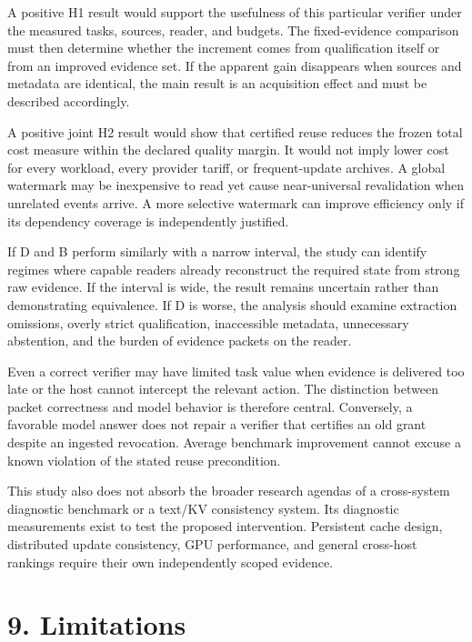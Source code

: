 \documentclass[
  11pt,
  a4paper,
]{article}
\begin{document}
A positive H1 result would support the usefulness of this particular
verifier under the measured tasks, sources, reader, and budgets. The
fixed-evidence comparison must then determine whether the increment
comes from qualification itself or from an improved evidence set. If the
apparent gain disappears when sources and metadata are identical, the
main result is an acquisition effect and must be described accordingly.

A positive joint H2 result would show that certified reuse reduces the
frozen total cost measure within the declared quality margin. It would
not imply lower cost for every workload, every provider tariff, or
frequent-update archives. A global watermark may be inexpensive to read
yet cause near-universal revalidation when unrelated events arrive. A
more selective watermark can improve efficiency only if its dependency
coverage is independently justified.

If D and B perform similarly with a narrow interval, the study can
identify regimes where capable readers already reconstruct the required
state from strong raw evidence. If the interval is wide, the result
remains uncertain rather than demonstrating equivalence. If D is worse,
the analysis should examine extraction omissions, overly strict
qualification, inaccessible metadata, unnecessary abstention, and the
burden of evidence packets on the reader.

Even a correct verifier may have limited task value when evidence is
delivered too late or the host cannot intercept the relevant action. The
distinction between packet correctness and model behavior is therefore
central. Conversely, a favorable model answer does not repair a verifier
that certifies an old grant despite an ingested revocation. Average
benchmark improvement cannot excuse a known violation of the stated
reuse precondition.

This study also does not absorb the broader research agendas of a
cross-system diagnostic benchmark or a text/KV consistency system. Its
diagnostic measurements exist to test the proposed intervention.
Persistent cache design, distributed update consistency, GPU
performance, and general cross-host rankings require their own
independently scoped evidence.

\section{9. Limitations}\label{limitations}
\end{document}
